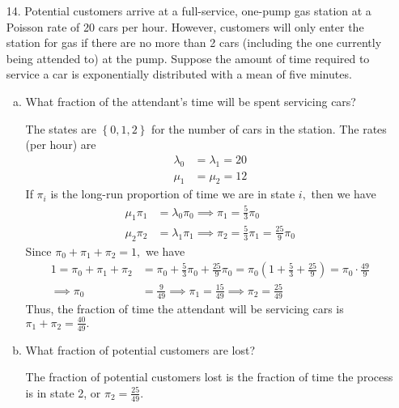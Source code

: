 \documentclass{article}
\begin{document}
\begin{itemize}
	\item[14.] Potential customers arrive at a full-service, one-pump gas station at a Poisson rate of 20 cars per hour. However, customers will only enter the station for gas if there are no more than 2 cars (including the one currently being attended to) at the pump. Suppose the amount of time required to service a car is exponentially distributed with a mean of five minutes.
		\begin{enumerate}[(a)]
			\item What fraction of the attendant's time will be spent servicing cars?
				\begin{soln}
					The states are $\left\{ 0, 1, 2 \right\}$ for the number of cars in the station. The rates (per hour) are
					\begin{align*}
						\lambda_0 &= \lambda_1 = 20 \\
						\mu_1 &= \mu_2 = 12
					\end{align*}
					If $\pi_i$ is the long-run proportion of time we are in state $i,$ then we have
					\begin{align*}
						\mu_1\pi_1 &= \lambda_0 \pi_0 \implies \pi_1 = \frac{5}{3} \pi_0 \\
						\mu_2 \pi_2 &= \lambda_1 \pi_1 \implies \pi_2 = \frac{5}{3} \pi_1 = \frac{25}{9} \pi_0
					\end{align*}
					Since $\pi_0+\pi_1+\pi_2=1,$ we have
					\begin{align*}
						1 = \pi_0+\pi_1+\pi_{2} &= \pi_0 + \frac{5}{3} \pi_0 + \frac{25}{9} \pi_0 = \pi_0\left(1+\frac{5}{3} + \frac{25}{9}\right) = \pi_0\cdot \frac{ 49}{9} \\
						\implies \pi_0 &= \frac{9}{49} \implies \pi_1 = \frac{15}{49} \implies \pi_2 = \frac{25}{49}
					\end{align*}
					Thus, the fraction of time the attendant will be servicing cars is $\pi_1+\pi_2=\frac{40}{49}.$
				\end{soln}

			\item What fraction of potential customers are lost?
				\begin{soln}
					The fraction of potential customers lost is the fraction of time the process is in state 2, or $\pi_2=\frac{25}{49}.$
				\end{soln}
				
		\end{enumerate}


\end{itemize}
\end{document}
